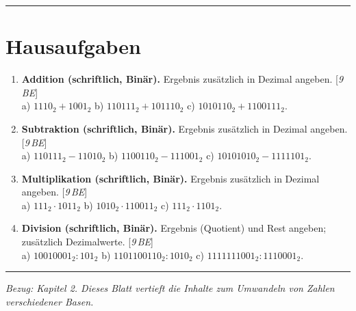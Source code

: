 \documentclass[11pt,a4paper]{scrartcl}
\newenvironment{aufgaben}{%
	\begin{enumerate}[leftmargin=*,label=\textbf{Aufgabe~\arabic*:}, itemsep=0.6em]
	}{\end{enumerate}}
\newcommand{\punkte}[1]{\hfill{\small[\textit{#1\,BE}]}}
\begin{document}
	\vspace{0.3em}
	\hrule
	\vspace{0.6em}
	
	\section*{Hausaufgaben}
	
	\begin{aufgaben}
		
		\item \textbf{Addition (schriftlich, Binär).} Ergebnis zusätzlich in Dezimal angeben. \punkte{9}\\
		a) \(1110_2 + 1001_2\)\quad
		b) \(110111_2 + 101110_2\)\quad
		c) \(1010110_2 + 1100111_2\).
		
		\item \textbf{Subtraktion (schriftlich, Binär).} Ergebnis zusätzlich in Dezimal angeben. \punkte{9}\\
		a) \(110111_2 - 11010_2\)\quad
		b) \(1100110_2 - 111001_2\)\quad
		c) \(10101010_2 - 1111101_2\).
		
		\item \textbf{Multiplikation (schriftlich, Binär).} Ergebnis zusätzlich in Dezimal angeben. \punkte{9}\\
		a) \(111_2 \cdot 1011_2\)\quad
		b) \(1010_2 \cdot 110011_2\)\quad
		c) \(111_2 \cdot 1101_2\).
		
		\item \textbf{Division (schriftlich, Binär).} Ergebnis (Quotient) und Rest angeben; zusätzlich Dezimalwerte. \punkte{9}\\
		a) \(10010001_2 : 101_2\)\quad
		b) \(1101100110_2 : 1010_2\)\quad
		c) \(1111111001_2 : 1110001_2\).
	\end{aufgaben}
	
	\vfill
	\hrule
	\small\emph{Bezug: Kapitel 2. Dieses Blatt vertieft die Inhalte zum Umwandeln von Zahlen verschiedener Basen.} %
\end{document}
